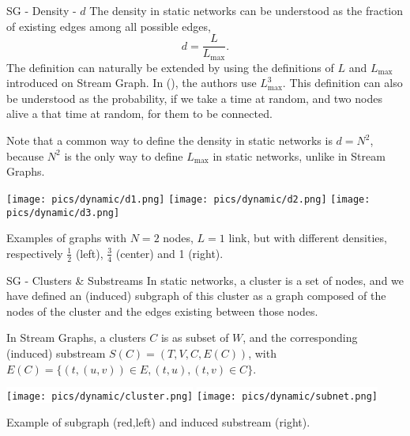 \begin{textbox}{SG - Density - $d$}
    The density in static networks can be understood as the fraction of existing edges among all possible edges,
    \[
        d=\frac{L}{L_{\max}}.
    \]
    The definition can naturally be extended by using the definitions of $L$ and $L_{\max}$ introduced on Stream Graph. In (\cite{latapy2018stream}), the authors use ${L_{\max}^3}$. This definition can also be understood as the probability, if we take a time at random, and two nodes alive a that time at random, for them to be connected.

    Note that a common way to define the density in static networks is $d=N^2$, because $N^2$ is the only way to define $L_{\max}$ in static networks, unlike in Stream Graphs.

    \centering
    \vspace{0.3cm}


    \texttt{[image: pics/dynamic/d1.png]}
    \texttt{[image: pics/dynamic/d2.png]}
    \texttt{[image: pics/dynamic/d3.png]}

    Examples of graphs with $N=2$ nodes, $L=1$ link, but with different densities, respectively $\frac{1}{2}$ (left), $\frac{3}{4}$ (center) and 1 (right).
\end{textbox}


\begin{textbox}{SG - Clusters \& Substreams}
    In static networks, a cluster is a set of nodes, and we have defined an (induced) subgraph of this cluster as a graph composed of the nodes of the cluster and the edges existing between those nodes.

    In Stream Graphs, a clusters $C$ is as subset of $W$, and the corresponding (induced) substream $S(C)=(T,V,C,E(C))$, with $E(C)=\{(t,(u,v)) \in E, (t,u),(t,v) \in C\}$.

    \centering

    \vspace{0.3cm}

    \colorbox{white}{\texttt{[image: pics/dynamic/cluster.png]}}
    \colorbox{white}{\texttt{[image: pics/dynamic/subnet.png]}}

    Example of subgraph (red,left) and induced substream (right).
\end{textbox}


